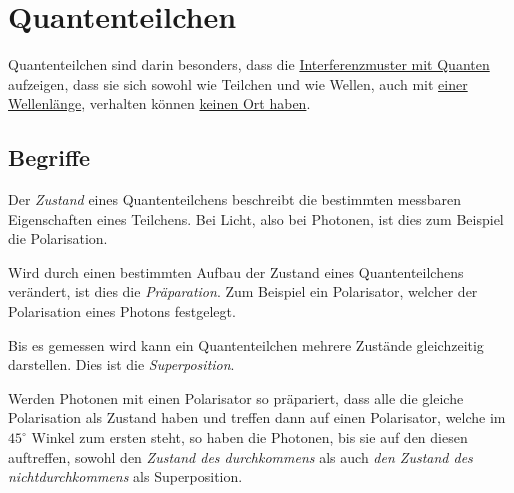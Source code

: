 \documentclass{article}
\begin{document}
\section{Quantenteilchen}
Quantenteilchen sind darin besonders, dass die \hyperref[Interferenzmuster mit Quanten]{Interferenzmuster mit Quanten} aufzeigen, dass sie sich sowohl wie Teilchen und wie Wellen, auch mit \hyperref[Die de-Broglie-Wellenlänge]{einer Wellenlänge}, verhalten können \hyperref[Das Delayed-Choice-Experiment]{keinen Ort haben}.
 
\subsection{Begriffe}
Der \emph{Zustand} eines Quantenteilchens beschreibt die bestimmten messbaren Eigenschaften eines Teilchens. Bei Licht, also bei Photonen, ist dies zum Beispiel die Polarisation.
 
Wird durch einen bestimmten Aufbau der Zustand eines Quantenteilchens verändert, ist dies die \emph{Präparation}. Zum Beispiel ein Polarisator, welcher der Polarisation eines Photons festgelegt.
 
Bis es gemessen wird kann ein Quantenteilchen mehrere Zustände gleichzeitig darstellen. Dies ist die \emph{Superposition}.
  
Werden Photonen mit einen Polarisator so präpariert, dass alle die gleiche Polarisation als Zustand haben und treffen dann auf einen Polarisator, welche im $45^\circ$ Winkel zum ersten steht, so haben die Photonen, bis sie auf den diesen auftreffen, sowohl den \textit{Zustand des durchkommens} als auch \textit{den Zustand des nichtdurchkommens} als Superposition.
 
\end{document}
